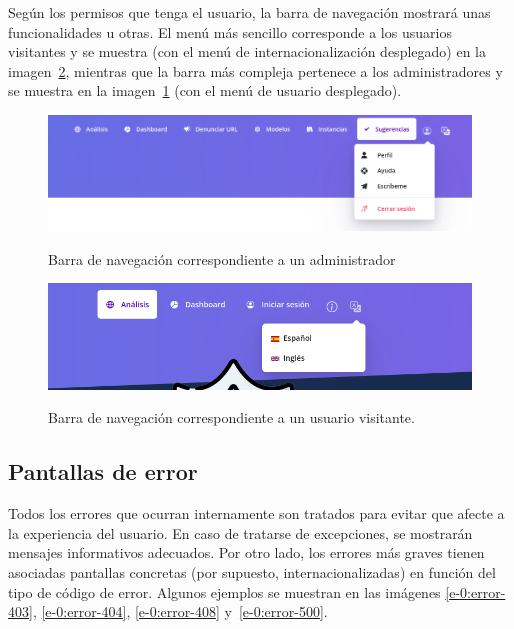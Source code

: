 Según los permisos que tenga el usuario, la barra de navegación mostrará unas funcionalidades u otras. El menú más sencillo corresponde a los usuarios visitantes y se muestra (con el menú de internacionalización desplegado) en la imagen~\ref{e-9:navbar-2}, mientras que la barra más compleja pertenece a los administradores y se muestra en la imagen~\ref{e-9:navbar} (con el menú de usuario desplegado).
\begin{figure}[h]
	\caption[Manual de usuario: barra navegación (usuario iniciado)]{Barra de navegación correspondiente a un administrador}
	\centering
	\includegraphics[width=\textwidth]{../img/anexos/user_guide/9_navbar_init}
	\label{e-9:navbar}
\end{figure}

\begin{figure}[h]
	\caption[Manual de usuario: barra navegación (visitante)]{Barra de navegación correspondiente a un usuario visitante.}
	\centering
	\includegraphics[width=\textwidth]{../img/anexos/user_guide/9_navbar_no_init}
	\label{e-9:navbar-2}
\end{figure}

\subsection{Pantallas de error}

Todos los errores que ocurran internamente son tratados para evitar que afecte a la experiencia del usuario. En caso de tratarse de excepciones, se mostrarán mensajes informativos adecuados. Por otro lado, los errores más graves tienen asociadas pantallas concretas (por supuesto, internacionalizadas) en función del tipo de código de error. Algunos ejemplos se muestran en las imágenes \ref{e-0:error-403}, \ref{e-0:error-404}, \ref{e-0:error-408} y~\ref{e-0:error-500}.

